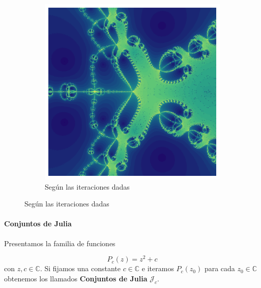 \begin{frame}{\insertsectionhead}
\begin{figure}[ht!]
\begin{subfigure}[b]{0.3\textwidth}
      \includegraphics[width=\textwidth]{screenshots/newton-velocidad.png}
      \caption*{Según las iteraciones dadas}
    \end{subfigure}
    \hspace{\fill}
  \end{figure}

    
\end{frame}

\begin{frame}{\insertsectionhead}
\framesubtitle{Conjuntos de Julia}
{\large 
Presentamos la familia de funciones 

$$
P_c(z) = z^2 + c
$$ con $z,c\in\mathbb C$.
\vfill
Si fijamos una constante $c\in\mathbb C$ e iteramos $P_c(z_0)$ para cada $z_0\in\mathbb C$ obtenemos los llamados \textbf{Conjuntos de Julia} $\mathcal{J}_c$.
}
\end{frame}


